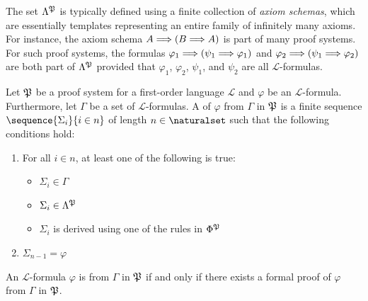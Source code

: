 \begin{rem}
    The set \( \Lambda^{\mathfrak{P}} \) is typically defined using a finite collection of \emph{axiom schemas}, which are essentially
    templates representing an entire family of infinitely many axioms.
    For instance, the axiom schema  \label{anchor:axiom-schema}
    \( A {\implies} \mleft( B {\implies} A \mright) \) is part of many proof systems.
    For such proof systems, the formulas \( \varphi_{1} {\implies} \mleft( \psi_{1} {\implies} \varphi_{1} \mright) \) and
    \( \varphi_2 {\implies} \mleft( \psi_1 {\implies} \varphi_{2} \mright) \) are both part of \( \Lambda^{\mathfrak{P}} \) provided
    that \( \varphi_1 \), \( \varphi_2 \), \( \psi_1 \), and \( \psi_2 \) are all \( \mathcal{L} \)-formulas.
\end{rem}

\begin{dfn}[Proof]
     \label{dfn:formal-proof}
    Let \( \mathfrak{P} \) be a proof system for a first-order language \( \mathcal{L} \) and \( \varphi \)
    be an \( \mathcal{L} \)-formula. Furthermore, let \( \Gamma \) be a set of \( \mathcal{L} \)-formulas.
    A  of \( \varphi \) from \( \Gamma \) in \( \mathfrak{P} \) is a finite sequence
    \( \sequence{\Sigma_i}{i \in n } \) of length \( n \in \naturalset \) such that the following conditions hold:
    \begin{enumerate}[topsep=2pt,noitemsep,label=\textup{\texttt{(\alph*)}}]
        \item For all \( i \in n \), at least one of the following is true:
            \begin{itemize}[topsep=2pt,noitemsep]
                \item \( \Sigma_i \in \Gamma \)
                \item \( \Sigma_i \in \Lambda^{\mathfrak{P}} \)
                \item \( \Sigma_i \) is derived using one of the rules in \( \Phi^{\mathfrak{P}} \)
            \end{itemize}
        \item \( \Sigma_{n-1} = \varphi \)
    \end{enumerate}
\end{dfn}

\begin{dfn}
     \label{dfn:provability}
    An \( \mathcal{L} \)-formula \( \varphi \) is  from \( \Gamma \) in \( \mathfrak{P} \) if and only if
    there exists a formal proof of \( \varphi \) from \( \Gamma \) in \( \mathfrak{P} \).
\end{dfn}

